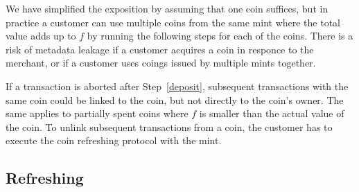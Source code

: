 \documentclass{llncs}
\begin{document}
We have simplified the exposition by assuming that one coin suffices, but
in practice a customer can use multiple coins from the same mint where
the total value adds up to $f$ by running the following steps for
each of the coins.  There is a risk of metadata leakage if a customer
acquires a coin in responce to the merchant, or if a customer uses
coings issued by multiple mints together.

If a transaction is aborted after Step~\ref{deposit},
subsequent transactions with the same coin could be linked to the coin,
but not directly to the coin's owner.  The same applies to partially
spent coins where $f$ is smaller than the actual value of the coin.
To unlink subsequent transactions from a coin, the customer has to
execute the coin refreshing protocol with the mint.

%
%
%


\subsection{Refreshing} \label{sec:refreshing}
\end{document}
